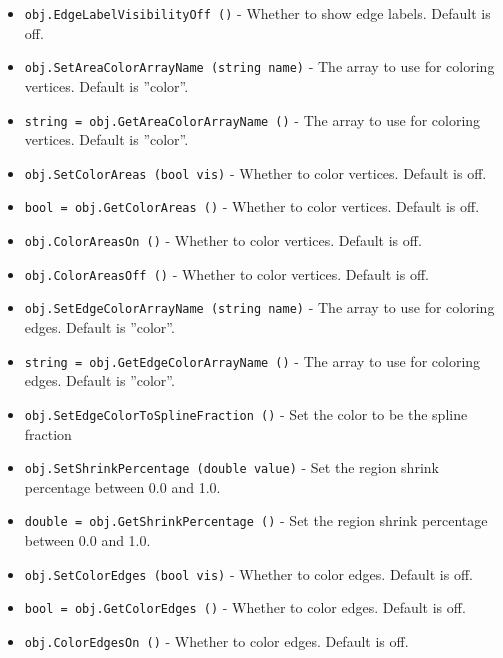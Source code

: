 \begin{itemize}
\item  \verb|obj.EdgeLabelVisibilityOff ()| -  Whether to show edge labels.  Default is off.

\item  \verb|obj.SetAreaColorArrayName (string name)| -  The array to use for coloring vertices.  Default is ''color''.

\item  \verb|string = obj.GetAreaColorArrayName ()| -  The array to use for coloring vertices.  Default is ''color''.

\item  \verb|obj.SetColorAreas (bool vis)| -  Whether to color vertices.  Default is off.

\item  \verb|bool = obj.GetColorAreas ()| -  Whether to color vertices.  Default is off.

\item  \verb|obj.ColorAreasOn ()| -  Whether to color vertices.  Default is off.

\item  \verb|obj.ColorAreasOff ()| -  Whether to color vertices.  Default is off.

\item  \verb|obj.SetEdgeColorArrayName (string name)| -  The array to use for coloring edges.  Default is ''color''.

\item  \verb|string = obj.GetEdgeColorArrayName ()| -  The array to use for coloring edges.  Default is ''color''.

\item  \verb|obj.SetEdgeColorToSplineFraction ()| -  Set the color to be the spline fraction

\item  \verb|obj.SetShrinkPercentage (double value)| -  Set the region shrink percentage between 0.0 and 1.0.

\item  \verb|double = obj.GetShrinkPercentage ()| -  Set the region shrink percentage between 0.0 and 1.0.

\item  \verb|obj.SetColorEdges (bool vis)| -  Whether to color edges.  Default is off.

\item  \verb|bool = obj.GetColorEdges ()| -  Whether to color edges.  Default is off.

\item  \verb|obj.ColorEdgesOn ()| -  Whether to color edges.  Default is off.


\end{itemize}

